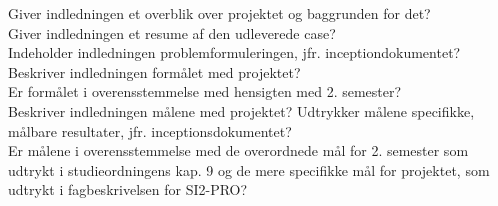 Giver indledningen et overblik over projektet og baggrunden for det?\\
Giver indledningen et resume af den udleverede case?\\
Indeholder indledningen problemformuleringen, jfr. inceptiondokumentet?\\
Beskriver indledningen formålet med projektet?\\ Er formålet i overensstemmelse med hensigten med 2. semester? \\
Beskriver indledningen målene med projektet? Udtrykker målene specifikke, målbare resultater, jfr. inceptionsdokumentet? \\
Er målene i overensstemmelse med de overordnede mål for 2. semester som udtrykt i studieordningens kap. 9 og de mere specifikke mål for projektet, som udtrykt i fagbeskrivelsen for SI2-PRO?

